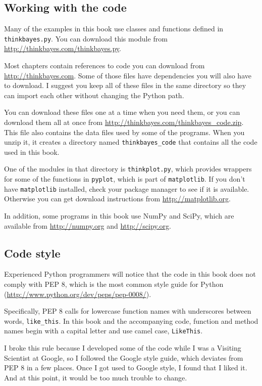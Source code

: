 \documentclass[12pt]{book}
\begin{document}
\subsection*{Working with the code}

Many of the examples in this book use classes and functions
defined in {\tt thinkbayes.py}.  You can download this module
from \url{http://thinkbayes.com/thinkbayes.py}.

Most chapters contain references to code you can download from
\url{http://thinkbayes.com}.  Some of those files have
dependencies you will also have to download.  I suggest you
keep all of these files in the same directory so they can import
each other without changing the Python path.

You can download these files one at a time when you need them, or you
can download them all at once from
\url{http://thinkbayes.com/thinkbayes_code.zip}.  This file also
contains the data files used by some of the programs.  When you unzip
it, it creates a directory named \verb"thinkbayes_code" that contains
all the code used in this book.

One of the modules in that directory is {\tt thinkplot.py},
which provides wrappers for some of the functions in {\tt pyplot},
which is part of {\tt matplotlib}.  If you don't have {\tt matplotlib}
installed, check your package manager to see if it is available.
Otherwise you can get download instructions
from \url{http://matplotlib.org}.

In addition, some programs in this book use NumPy and SciPy, which are
available from \url{http://numpy.org} and \url{http://scipy.org}.


\subsection*{Code style}

Experienced Python programmers will notice that the code in this
book does not comply with PEP 8, which is the most common
style guide for Python (\url{http://www.python.org/dev/peps/pep-0008/}).

Specifically, PEP 8 calls for lowercase function names with
underscores between words, \verb"like_this".  In this book and
the accompanying code, function and method names begin with
a capital letter and use camel case, \verb"LikeThis".

I broke this rule because I developed some of the code
while I was a Visiting Scientist at Google, so I followed
the Google style guide, which deviates from PEP 8 in a few
places.  Once I got used to Google style, I found that I liked
it.  And at this point, it would be too much trouble to change.
\end{document}
